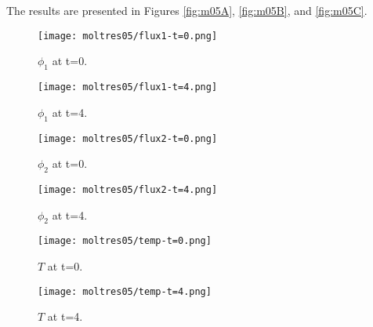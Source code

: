 \documentclass[11pt,letterpaper]{article}
\begin{document}
The results are presented in Figures \ref{fig:m05A}, \ref{fig:m05B}, and \ref{fig:m05C}.
\begin{figure*}[!h]
	\centering
	\begin{subfigure}[t]{0.4\textwidth}
		\centering
		\texttt{[image: moltres05/flux1-t=0.png]} 
		\caption{$\phi_{1}$ at t=0.}
		\label{fig:m05-flux1-1}
	\end{subfigure}
	\vspace{1cm}
	\begin{subfigure}[t]{0.4\textwidth}
		\centering
		\texttt{[image: moltres05/flux1-t=4.png]} 
		\caption{$\phi_{1}$ at t=4.}
		\label{fig:m05-flux1-5}
	\end{subfigure}
	\hfill
	\caption{Flux1.}
	\label{fig:m05A}
\end{figure*}

\begin{figure*}[!h]
	\centering
	\begin{subfigure}[t]{0.4\textwidth}
		\centering
		\texttt{[image: moltres05/flux2-t=0.png]} 
		\caption{$\phi_{2}$ at t=0.}
		\label{fig:m05-flux2-1}
	\end{subfigure}
	\vspace{1cm}
	\begin{subfigure}[t]{0.4\textwidth}
		\centering
		\texttt{[image: moltres05/flux2-t=4.png]} 
		\caption{$\phi_{2}$ at t=4.}
		\label{fig:m05-flux2-5}
	\end{subfigure}
	\hfill
	\caption{Flux2.}
	\label{fig:m05B}
\end{figure*}

\begin{figure*}[!h]
	\centering
	\begin{subfigure}[t]{0.4\textwidth}
		\centering
		\texttt{[image: moltres05/temp-t=0.png]} 
		\caption{$T$ at t=0.}
		\label{fig:m05-temp-1}
	\end{subfigure}
	\vspace{1cm}
	\begin{subfigure}[t]{0.4\textwidth}
		\centering
		\texttt{[image: moltres05/temp-t=4.png]} 
		\caption{$T$ at t=4.}
		\label{fig:m05-temp-5}
	\end{subfigure}
	\hfill
	\caption{Temperature.}
	\label{fig:m05C}
\end{figure*}

\pagebreak 


\end{document}
